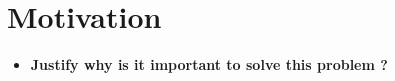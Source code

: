 \section{Motivation}
\begin{itemize}
\item \textbf{Justify why is it important to solve this problem ?}
\end{itemize}

